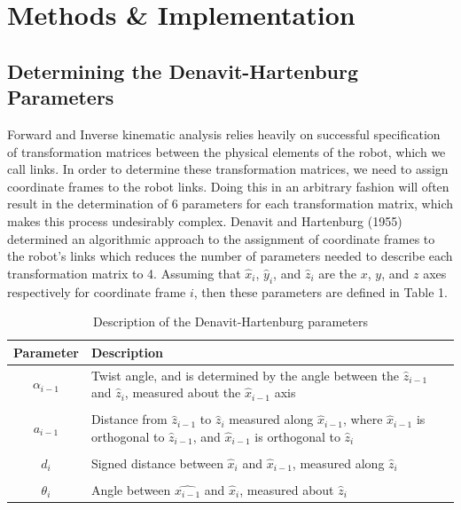 \documentclass[a4paper]{article}
\begin{document}
\newpage

\section{Methods \& Implementation}

\subsection{Determining the Denavit-Hartenburg Parameters}
Forward and Inverse kinematic analysis relies heavily on successful specification of transformation matrices between the physical elements of the robot, which we call links. In order to determine these transformation matrices, we need to assign coordinate frames to the robot links. Doing this in an arbitrary fashion will often result in the determination of 6 parameters for each transformation matrix, which makes this process undesirably complex. Denavit and Hartenburg (1955) determined an algorithmic approach to the assignment of coordinate frames to the robot's links which reduces the number of parameters needed to describe each transformation matrix to 4. Assuming that $\hat{x}_i$, $\hat{y}_i$, and $\hat{z}_i$ are the $x$, $y$, and $z$ axes respectively for coordinate frame $i$, then these parameters are defined in Table 1.

\begin{table}[h]
\centering
\caption{Description of the Denavit-Hartenburg parameters}
\begin{tabular}{cp{8cm}}
\toprule
\textbf{Parameter} & \textbf{Description}\\
\midrule
$\alpha_{i-1}$ & Twist angle, and is determined by the angle between the $\hat{z}_{i-1}$ and $\hat{z}_i$, measured about the $\hat{x}_{i-1}$ axis\\
 & \\
$a_{i-1}$ & Distance from $\hat{z}_{i-1}$ to $\hat{z}_i$ measured along $\hat{x}_{i-1}$, where $\hat{x}_{i-1}$ is orthogonal to $\hat{z}_{i-1}$, and $\hat{x}_{i-1}$ is orthogonal to $\hat{z}_i$\\
 & \\
$d_i$ & Signed distance between $\hat{x}_i$ and $\hat{x}_{i-1}$, measured along $\hat{z}_i$\\
 & \\
$\theta_i$ & Angle between $\hat{x_{i-1}}$ and $\hat{x}_i$, measured about $\hat{z}_i$\\
\bottomrule
\end{tabular}
\end{table}
\end{document}
